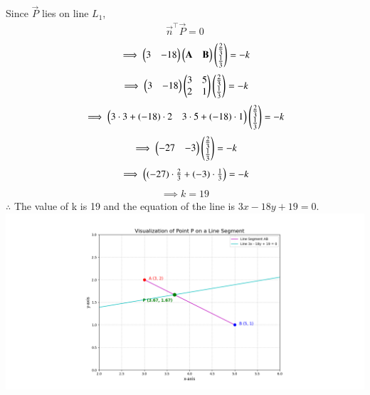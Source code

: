 \documentclass[journal]{IEEEtran}
\begin{document}
Since $\vec{P}$ lies on line $L_1$,
\begin{align}
    \vec{n}^{\top}\vec{P}=0
\end{align}
\begin{align}
	\implies \begin{pmatrix}3 &-18\end{pmatrix}\begin{pmatrix}\mathbf{A} & \mathbf{B}\end{pmatrix}\begin{pmatrix}\frac{2}{3}\\\frac{1}{3}\end{pmatrix}=-k
\end{align}
\begin{align}
    \implies \begin{pmatrix}3 & -18\end{pmatrix}\begin{pmatrix}3 & 5\\2 & 1\end{pmatrix}\begin{pmatrix}\frac{2}{3}\\\frac{1}{3}\end{pmatrix}=-k
\end{align}
\begin{align}
    \implies \begin{pmatrix}3\cdot 3 + (-18)\cdot 2 & 3\cdot 5 + (-18)\cdot 1\end{pmatrix}\begin{pmatrix}\frac{2}{3}\\\frac{1}{3}\end{pmatrix}=-k
\end{align}
\begin{align}
    \implies \begin{pmatrix}-27&-3\end{pmatrix}\begin{pmatrix}\frac{2}{3}\\\frac{1}{3}\end{pmatrix}=-k
\end{align}
\begin{align}
    \implies \begin{pmatrix}(-27)\cdot \frac{2}{3} + (-3)\cdot \frac{1}{3}\end{pmatrix}=-k
\end{align}
\begin{align}
    \implies k=19
\end{align}
$\therefore$ The value of k is 19 and the equation of the line is $3x - 18y+19=0$.
\centering   \includegraphics[width=\columnwidth, height=1\textheight, keepaspectratio]{figs/fig1.png} 
\end{document}
